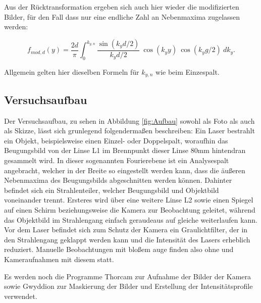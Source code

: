 \documentclass{article}
\begin{document}
Aus der Rücktransformation ergeben sich auch hier wieder die modifizierten Bilder, für den Fall dass nur eine endliche Zahl an Nebenmaxima zugelassen werden:

\begin{equation}
    f_{mod,d} (y) = \frac{2d}{\pi} \int_0^{k_{y,n}} \frac{\sin{(k_y d / 2)}}{k_y d / 2} \ \cos{(k_y y)} \ \cos{(k_y g / 2)} \ dk_y.
\end{equation}

Allgemein gelten hier dieselben Formeln für $k_{y,n}$ wie beim Einzespalt.

\newpage
\subsection{Versuchsaufbau}

Der Versuchsaufbau, zu sehen in Abbildung \ref{fig:Aufbau} sowohl als Foto als auch als Skizze, lässt sich grunlegend folgendermaßen beschreiben: Ein Laser bestrahlt ein Objekt, beispielsweise einen Einzel- oder Doppelspalt, woraufhin das Beugungsbild von der Linse L1 im Brennpunkt dieser Linse 80mm hintendran gesammelt wird. In dieser sogenannten Fourierebene ist ein Analysespalt angebracht, welcher in der Breite so eingestellt werden kann, dass die äußeren Nebenmaxima des Beugungsbilds abgeschnitten werden können. Dahinter befindet sich ein Strahlenteiler, welcher Beugungsbild und Objektbild voneinander trennt. Ersteres wird über eine weitere Linse L2 sowie einen Spiegel auf einen Schirm beziehungsweise die Kamera zur Beobachtung geleitet, während das Objektbild im Strahlengang einfach geraudeaus auf gleiche weiterlaufen kann. Vor dem Laser befindet sich zum Schutz der Kamera ein Graulichtfilter, der in den Strahlengang geklappt werden kann und die Intensität des Lasers erheblich reduziert. Manuelle Beobachtungen mit bloßem auge finden also ohne und Kameraufnahmen mit diesem statt. 

Es werden noch die Programme Thorcam zur Aufnahme der Bilder der Kamera sowie Gwyddion zur Maskierung der Bilder und Erstellung der Intensitätsprofile verwendet. 
\end{document}
